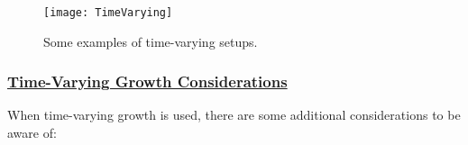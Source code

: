 \begin{figure}[ht]
	\begin{center}
		\texttt{[image: TimeVarying]}\\
	\end{center}
	\caption{Some examples of time-varying setups.}
	\label{(fig:timevarying)}
\end{figure}

\pagebreak



\hypertarget{tvgrowth}{}
\subsubsection[Time-Varying Growth Considerations]{\protect\hyperlink{tvgrowth}{Time-Varying Growth Considerations}}
When time-varying growth is used, there are some additional considerations to be aware of:
